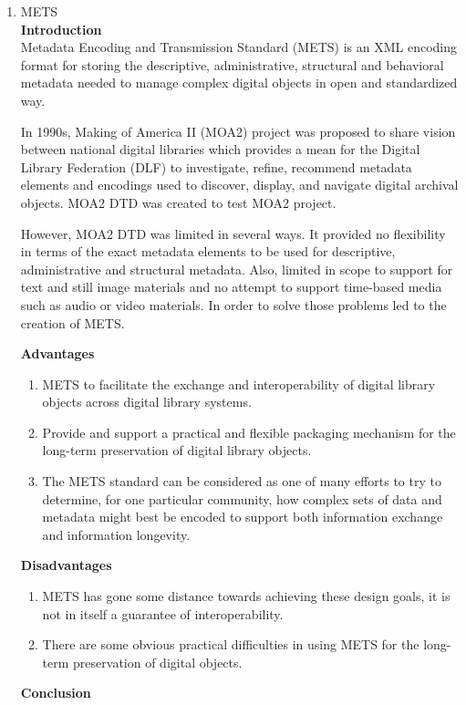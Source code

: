\begin{enumerate}
	\item METS\\
	{\bf Introduction}\\
	Metadata Encoding and Transmission Standard (METS) is an XML encoding format for storing the descriptive, administrative, structural and behavioral metadata needed to manage complex digital objects in open and standardized way.
	
	In 1990s, Making of America II (MOA2) project was proposed to share vision between national digital libraries 
	which provides a mean for the Digital Library Federation (DLF) to investigate, refine, recommend metadata elements and encodings used to discover, display, and navigate digital archival objects.
	MOA2 DTD was created to test MOA2 project.
	
	However, MOA2 DTD was limited in several ways. 
	It provided no flexibility in terms of the exact metadata elements to be used for descriptive, administrative and structural metadata. 
	Also, limited in scope to support for text and still image materials and no attempt to support time-based media such as audio or video materials. 
	In order to solve those problems led to the creation of METS.
	
	{\bf Advantages}
	\begin{enumerate}
		\item METS to facilitate the exchange and interoperability of digital library objects across digital library systems.
		\item Provide and support a practical and flexible packaging mechanism for the long-term preservation of digital library objects.
		\item The METS standard can be considered as one of many efforts to try to determine, for one particular community, how complex sets of data and metadata might best be encoded to support both information exchange and information longevity.
	\end{enumerate}	
	{\bf Disadvantages}
	\begin{enumerate}
		\item METS has gone some distance towards achieving these design goals, it is not in itself a guarantee of interoperability.
		\item There are some obvious practical difficulties in using METS for the long-term preservation of digital objects.
	\end{enumerate}
	{\bf Conclusion}\\	
	

\end{enumerate}
